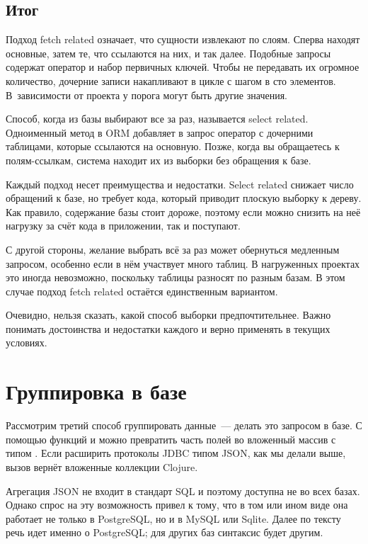 \subsection{Итог}

Подход fetch related означает, что сущности извлекают по слоям. Сперва находят основные, затем те, что ссылаются на них, и так далее. Подобные запросы содержат оператор  и набор первичных ключей. Чтобы не передавать их огромное количество, дочерние записи накапливают в цикле с шагом в сто элементов. В~зависимости от проекта у порога могут быть другие значения.

Способ, когда из базы выбирают все за раз, называется select related. Одноименный метод в ORM добавляет в запрос оператор  с дочерними таблицами, которые ссылаются на основную. Позже, когда вы обращаетесь к полям-ссылкам, система находит их из выборки без обращения к базе.

Каждый подход несет преимущества и недостатки. Select related снижает число обращений к базе, но требует кода, который приводит плоскую выборку к дереву. Как правило, содержание базы стоит дороже, поэтому если можно снизить на неё нагрузку за счёт кода в приложении, так и поступают.

С другой стороны, желание выбрать всё за раз может обернуться медленным запросом, особенно если в нём участвует много таблиц. В нагруженных проектах это иногда невозможно, поскольку таблицы разносят по разным базам. В этом случае подход fetch related остаётся единственным вариантом.

Очевидно, нельзя сказать, какой способ выборки предпочтительнее. Важно понимать достоинства и недостатки каждого и верно применять в текущих условиях.

\section{Группировка в базе}


Рассмотрим третий способ группировать данные~--- делать это запросом в базе. С помощью функций  и  можно превратить часть полей во вложенный массив с типом . Если расширить протоколы JDBC типом JSON, как мы делали выше, вызов  вернёт вложенные коллекции Clojure.

Агрегация JSON не входит в стандарт SQL и поэтому доступна не во всех базах. Однако спрос на эту возможность привел к тому, что в том или ином виде она работает не только в PostgreSQL, но и в MySQL или Sqlite. Далее по тексту речь идет именно о PostgreSQL; для других баз синтаксис будет другим.

